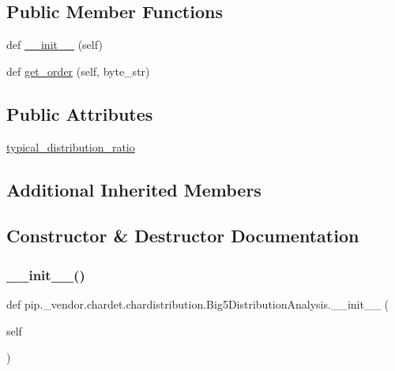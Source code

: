 \subsection*{Public Member Functions}
\begin{DoxyCompactItemize}
\item 
def \hyperlink{classpip_1_1__vendor_1_1chardet_1_1chardistribution_1_1Big5DistributionAnalysis_a58300306274eaef3204507ae52b0bcd2}{\+\_\+\+\_\+init\+\_\+\+\_\+} (self)
\item 
def \hyperlink{classpip_1_1__vendor_1_1chardet_1_1chardistribution_1_1Big5DistributionAnalysis_a23d61e750935983f6ed945685038a192}{get\+\_\+order} (self, byte\+\_\+str)
\end{DoxyCompactItemize}
\subsection*{Public Attributes}
\begin{DoxyCompactItemize}
\item 
\hyperlink{classpip_1_1__vendor_1_1chardet_1_1chardistribution_1_1Big5DistributionAnalysis_abbd353ae71a97ff0795b95571fbe4682}{typical\+\_\+distribution\+\_\+ratio}
\end{DoxyCompactItemize}
\subsection*{Additional Inherited Members}


\subsection{Constructor \& Destructor Documentation}
\mbox{\label{classpip_1_1__vendor_1_1chardet_1_1chardistribution_1_1Big5DistributionAnalysis_a58300306274eaef3204507ae52b0bcd2}} 
\subsubsection{\texorpdfstring{\+\_\+\+\_\+init\+\_\+\+\_\+()}{\_\_init\_\_()}}
{\footnotesize\ttfamily def pip.\+\_\+vendor.\+chardet.\+chardistribution.\+Big5\+Distribution\+Analysis.\+\_\+\+\_\+init\+\_\+\+\_\+ (\begin{DoxyParamCaption}\item[{}]{self }\end{DoxyParamCaption})}



